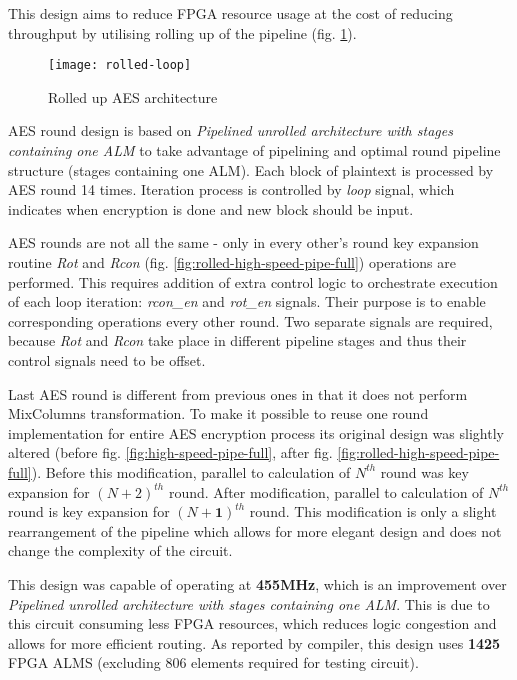 This design aims to reduce FPGA resource usage at the cost of reducing throughput by utilising rolling up of the pipeline (fig. \ref{fig:rolled-loop}).

\begin{figure}[!h]
\centering
\texttt{[image: rolled-loop]}
\caption{Rolled up AES architecture}
\label{fig:rolled-loop}
\end{figure}

AES round design is based on \textit{Pipelined unrolled architecture with stages containing one ALM} to take advantage of pipelining and optimal round pipeline structure (stages containing one ALM). Each block of plaintext is processed by AES round 14 times. Iteration process is controlled by \textit{loop} signal, which indicates when encryption is done and new block should be input. 

AES rounds are not all the same - only in every other's round key expansion routine \textit{Rot} and \textit{Rcon} (fig. \ref{fig:rolled-high-speed-pipe-full}) operations are performed. This requires addition of extra control logic to orchestrate execution of each loop iteration: \textit{rcon\_en} and \textit{rot\_en} signals. Their purpose is to enable corresponding operations every other round. Two separate signals are required, because \textit{Rot} and \textit{Rcon} take place in different pipeline stages and thus their control signals need to be offset.

Last AES round is different from previous ones in that it does not perform MixColumns transformation. To make it possible to reuse one round implementation for entire AES encryption process its original design was slightly altered (before fig. \ref{fig:high-speed-pipe-full}, after fig. \ref{fig:rolled-high-speed-pipe-full}). Before this modification, parallel to calculation of $N^{th}$ round was key expansion for $(N + 2)^{th}$ round. After modification, parallel to calculation of $N^{th}$ round is key expansion for $(N + \textbf{1})^{th}$ round. This modification is only a slight rearrangement of the pipeline which allows for more elegant design and does not change the complexity of the circuit. 

This design was capable of operating at \textbf{455MHz}, which is an improvement over \textit{Pipelined unrolled architecture with stages containing one ALM}. This is due to this circuit consuming less FPGA resources, which reduces logic congestion and allows for more efficient routing. As reported by compiler, this design uses \textbf{1425} FPGA ALMS (excluding 806 elements required for testing circuit).


